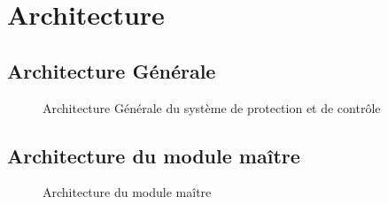 \section{Architecture}
	
	\subsection{Architecture Générale}
		
		\begin{figure}[H]
			\centering
			\caption{Architecture Générale du système de protection et de contrôle}
			\label{fig:architecture_generale}
		\end{figure}

	\subsection{Architecture du module maître}
	
		\begin{figure}[H]
			\centering
			\caption{Architecture du module maître}
			\label{fig:architecture_master}
		\end{figure}

